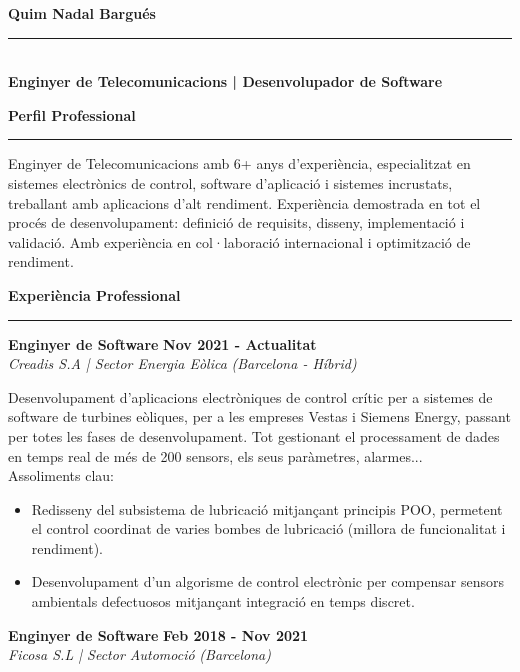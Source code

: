 \documentclass[11pt,a4paper]{article}
\newcommand{\cvsection}[1]{
    \vspace{0.5em}
    \noindent\textbf{\large #1}
    \vspace{0.5em}
    \hrule\vspace{0.5em}
}
\begin{document}
\hfill
\begin{minipage}[t]{0.68\textwidth}
    \vspace*{-26\baselineskip}
    \nointerlineskip
    \begin{flushleft}
        {\fontsize{22}{0}\selectfont\bfseries Quim Nadal Bargués} \\
        \vspace{-8pt}
        \rule{\linewidth}{0.5pt} \\
        \vspace{4pt}
        {\large\bfseries Enginyer de Telecomunicacions | Desenvolupador de Software}
    \end{flushleft}
    
    \cvsection{Perfil Professional}
    Enginyer de Telecomunicacions amb 6+ anys d'experiència, especialitzat en sistemes electrònics de control, software d'aplicació i sistemes incrustats, treballant amb aplicacions d'alt rendiment. Experiència demostrada en tot el procés de desenvolupament: definició de requisits, disseny, implementació i validació. Amb experiència en col·laboració internacional i optimització de rendiment.
   
    \cvsection{Experiència Professional}
    \noindent
    \textbf{Enginyer de Software} \hfill \textbf{Nov 2021 - Actualitat} \\
    \textit{Creadis S.A | Sector Energia Eòlica} \hfill \textit{(Barcelona - Híbrid)}
    
    Desenvolupament d'aplicacions electròniques de control crític per a sistemes de software de turbines eòliques, per a les empreses Vestas i Siemens Energy, passant per totes les fases de desenvolupament. Tot gestionant el processament de dades en temps real de més de 200 sensors, els seus paràmetres, alarmes... \\
    Assoliments clau:
    \begin{itemize}[leftmargin=*,topsep=2pt,itemsep=-1pt]
        \item Redisseny del subsistema de lubricació mitjançant principis POO, permetent el control coordinat de varies bombes de lubricació (millora de funcionalitat i rendiment).
        \item Desenvolupament d'un algorisme de control electrònic per compensar sensors ambientals defectuosos mitjançant integració en temps discret.
    \end{itemize}
    
    \noindent
    \textbf{Enginyer de Software} \hfill \textbf{Feb 2018 - Nov 2021} \\
    \textit{Ficosa S.L | Sector Automoció} \hfill \textit{(Barcelona)} \vspace{4pt}
    

\end{minipage}
\end{document}
